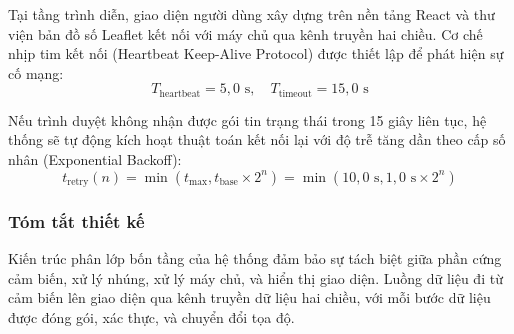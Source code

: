 \hspace{0.5cm} Tại tầng trình diễn, giao diện người dùng xây dựng trên nền tảng React và thư viện bản đồ số Leaflet kết nối với máy chủ qua kênh truyền hai chiều. Cơ chế nhịp tim kết nối (Heartbeat Keep-Alive Protocol) được thiết lập để phát hiện sự cố mạng:
\begin{equation}
T_{\text{heartbeat}} = 5{,}0\text{ s}, \quad T_{\text{timeout}} = 15{,}0\text{ s}
\label{eq:heartbeat-timeout-formula}
\end{equation}

Nếu trình duyệt không nhận được gói tin trạng thái trong 15 giây liên tục, hệ thống sẽ tự động kích hoạt thuật toán kết nối lại với độ trễ tăng dần theo cấp số nhân (Exponential Backoff):
\begin{equation}
t_{\text{retry}}(n) = \min(t_{\max}, t_{\text{base}} \times 2^n) = \min(10{,}0\text{ s}, 1{,}0\text{ s} \times 2^n)
\label{eq:exponential-backoff-retry}
\end{equation}

\begin{table}[H]
\centering
\caption{Kịch bản thời gian tự động phục hồi kết nối giao diện theo thuật toán Exponential Backoff}
\label{tab:exponential-backoff-schedule}
\end{table}

\subsubsection{Tóm tắt thiết kế}

\hspace{0.5cm} Kiến trúc phân lớp bốn tầng của hệ thống đảm bảo sự tách biệt giữa phần cứng cảm biến, xử lý nhúng, xử lý máy chủ, và hiển thị giao diện. Luồng dữ liệu đi từ cảm biến lên giao diện qua kênh truyền dữ liệu hai chiều, với mỗi bước dữ liệu được đóng gói, xác thực, và chuyển đổi tọa độ.

